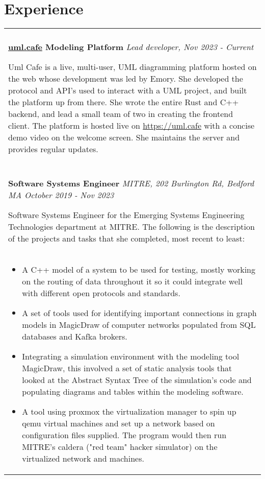 \documentclass[11pt]{article}
\begin{document}
\section*{Experience}
\begin{tabular}{p{18.5cm}}
    \hline
    \multicolumn{1}{c}{} \\

     \large \textbf{\href{https://uml.cafe}{uml.cafe} Modeling Platform} \normalsize \textit{Lead developer, \hfill Nov 2023 - Current}

     \> Uml Cafe is a live, multi-user, UML diagramming platform hosted on the web whose development was led 
     by Emory. She developed the protocol and API's used to interact with a UML project, and built the platform up from there. She wrote the
     entire Rust and C++ backend, and lead a small team of two in creating the frontend client. The platform is hosted live on 
     \url{https://uml.cafe} with a concise demo video on the welcome screen. She maintains the server and provides regular updates.\\
 
     \multicolumn{1}{c}{} \\

    \large \textbf{Software Systems Engineer} \normalsize \textit{MITRE, 202 Burlington Rd, Bedford MA \hfill October 2019 - Nov 2023}

    \> Software Systems Engineer for the Emerging Systems Engineering Technologies department at MITRE. The following is the 
    description of the projects and tasks that she completed, most recent to least:\\ 

    \begin{itemize}[noitemsep,topsep=0pt]
      \item A C++ model of a system to be used for testing, mostly working on the routing of data throughout it so it could 
      integrate well with different open protocols and standards.
      \item A set of tools used for identifying important connections in graph models in MagicDraw of computer networks populated from SQL 
      databases and Kafka brokers.
      \item Integrating a simulation environment with the modeling tool MagicDraw, this involved 
      a set of static analysis tools that looked at the Abstract Syntax Tree of the simulation's code and populating diagrams and 
      tables within the modeling software.
      \item A tool using proxmox the virtualization manager to spin up qemu virtual machines and 
      set up a network based on configuration files supplied. The program would then run MITRE's caldera ("red team" hacker simulator) on 
      the virtualized network and machines.
    \end{itemize}\\


\end{tabular}
\end{document}
